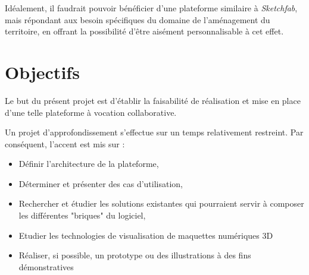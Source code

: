 Idéalement, il faudrait pouvoir bénéficier d'une plateforme similaire à \textit{Sketchfab}, mais répondant aux besoin spécifiques du domaine de l'aménagement du territoire, en offrant la possibilité d'être aisément personnalisable à cet effet.

\section{Objectifs}

Le but du présent projet est d'établir la faisabilité de réalisation et mise en place d'une telle plateforme à vocation collaborative.

Un projet d'approfondissement s'effectue sur un temps relativement restreint. 
Par conséquent, l'accent est mis sur :


\begin{itemize}
    \item Définir l'architecture de la plateforme,
    \item Déterminer et présenter des cas d'utilisation,
    \item Rechercher et étudier les solutions existantes qui pourraient servir à composer les différentes "briques" du logiciel,
    \item Etudier les technologies de visualisation de maquettes numériques 3D
    \item Réaliser, si possible, un prototype ou des illustrations à des fins démonstratives
\end{itemize}

